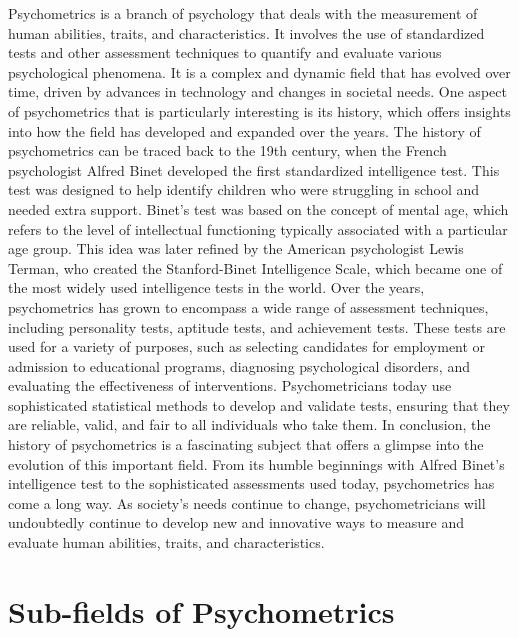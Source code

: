 \documentclass[12pt, a4paper]{exam}
\begin{document}
Psychometrics is a branch of psychology that deals with the measurement of human abilities, traits, and characteristics. It involves the use of standardized tests and other assessment techniques to quantify and evaluate various psychological phenomena. It is a complex and dynamic field that has evolved over time, driven by advances in technology and changes in societal needs. One aspect of psychometrics that is particularly interesting is its history, which offers insights into how the field has developed and expanded over the years. The history of psychometrics can be traced back to the 19th century, when the French psychologist Alfred Binet developed the first standardized intelligence test. This test was designed to help identify children who were struggling in school and needed extra support. Binet’s test was based on the concept of mental age, which refers to the level of intellectual functioning typically associated with a particular age group. This idea was later refined by the American psychologist Lewis Terman, who created the Stanford-Binet Intelligence Scale, which became one of the most widely used intelligence tests in the world. Over the years, psychometrics has grown to encompass a wide range of assessment techniques, including personality tests, aptitude tests, and achievement tests. These tests are used for a variety of purposes, such as selecting candidates for employment or admission to educational programs, diagnosing psychological disorders, and evaluating the effectiveness of interventions. Psychometricians today use sophisticated statistical methods to develop and validate tests, ensuring that they are reliable, valid, and fair to all individuals who take them. In conclusion, the history of psychometrics is a fascinating subject that offers a glimpse into the evolution of this important field. From its humble beginnings with Alfred Binet’s intelligence test to the sophisticated assessments used today, psychometrics has come a long way. As society’s needs continue to change, psychometricians will undoubtedly continue to develop new and innovative ways to measure and evaluate human abilities, traits, and characteristics.

\section{Sub-fields of Psychometrics}
\end{document}
